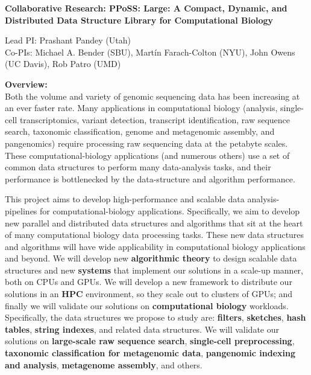 
\begin{center}

\bf
\Large
Collaborative Research: PPoSS\@: Large: A Compact, Dynamic, and Distributed Data
Structure Library for Computational Biology

\small
Lead PI: Prashant Pandey (Utah)\\
Co-PIs: Michael A. Bender (SBU), Mart\'{i}n Farach-Colton (NYU), John Owens (UC Davis), Rob Patro (UMD)
\end{center}

\vspace{-0.3cm}

\noindent \textbf{\large Overview:}\\
Both the volume and variety of genomic sequencing data has been increasing at an ever faster rate. 
Many applications in computational biology (\kmer analysis, single-cell transcriptomics, variant detection, transcript identification, raw sequence search, taxonomic classification, genome and metagenomic assembly, and pangenomics) require processing raw sequencing data at the petabyte scales.
%
These computational-biology applications (and numerous others) use a set of common data structures to perform many data-analysis tasks, and their performance is bottlenecked by the data-structure and algorithm performance.

This project aims to develop high-performance and scalable data analysis-pipelines for computational-biology applications. Specifically, we aim to develop new parallel and distributed data structures and algorithms that sit at the heart of many computational biology data processing tasks. These new data structures and algorithms will have wide applicability in computational biology applications and beyond.
%
We will develop new \textbf{algorithmic theory} to design scalable data structures and new \textbf{systems} that implement our solutions in a scale-up manner, both on CPUs and GPUs. We will develop a new framework to distribute our solutions in an \textbf{HPC} environment, so they scale out to clusters of GPUs; and finally we will validate our solutions on \textbf{computational biology} workloads.
%
Specifically, the data structures we propose to study are: \textbf{filters}, \textbf{sketches}, \textbf{hash tables}, \textbf{string indexes}, and related data structures.  We will validate our solutions on \textbf{large-scale raw sequence search}, \textbf{single-cell preprocessing}, \textbf{taxonomic classification for metagenomic data}, \textbf{pangenomic indexing and analysis}, \textbf{metagenome assembly}, and others.

